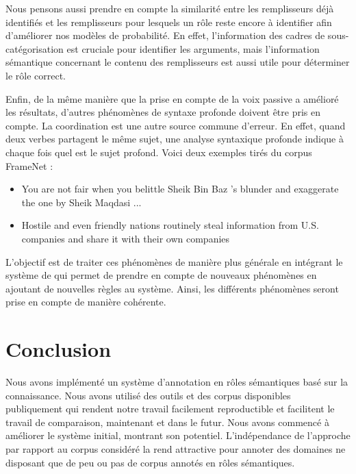 Nous pensons aussi prendre en compte la similarité entre les remplisseurs déjà
identifiés et les remplisseurs pour lesquels un rôle reste encore à identifier
afin d'améliorer nos modèles de probabilité. En effet, l'information des cadres
de sous-catégorisation est cruciale pour identifier les arguments, mais
l'information sémantique concernant le contenu des remplisseurs est aussi utile
pour déterminer le rôle correct.

Enfin, de la même manière que la prise en compte de la voix passive a amélioré
les résultats, d'autres phénomènes de syntaxe profonde doivent être pris en
compte. La coordination est une autre source commune d'erreur. En effet, quand
deux verbes partagent le même sujet, une analyse syntaxique profonde indique à
chaque fois quel est le sujet profond. Voici deux exemples tirés du corpus
FrameNet :

\begin{itemize}
    \item You are not fair when you belittle Sheik Bin Baz 's blunder and
          exaggerate the one by Sheik Maqdasi ...
    \item Hostile and even friendly nations routinely steal information from
          U.S. companies and share it with their own companies
\end{itemize}

L'objectif est de traiter ces phénomènes de manière plus générale en intégrant
le système de \cite{ribeyre2013systeme} qui permet de prendre en compte de
nouveaux phénomènes en ajoutant de nouvelles règles au système. Ainsi, les
différents phénomènes seront prise en compte de manière cohérente.

\section{Conclusion}

Nous avons implémenté un système d'annotation en rôles sémantiques basé sur la
connaissance. Nous avons utilisé des outils et des corpus disponibles
publiquement qui rendent notre travail facilement reproductible et facilitent
le travail de comparaison, maintenant et dans le futur. Nous avons commencé à
améliorer le système initial, montrant son potentiel. L'indépendance de
l'approche par rapport au corpus considéré la rend attractive pour annoter des
domaines ne disposant que de peu ou pas de corpus annotés en rôles sémantiques.
